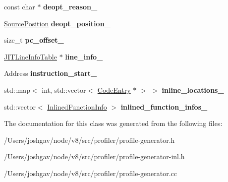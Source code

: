 \begin{DoxyCompactItemize}
\item 
const char $\ast$ {\bfseries deopt\+\_\+reason\+\_\+}\hypertarget{classv8_1_1internal_1_1_code_entry_a46d798d3a97e54b4719b54176f120787}{}\label{classv8_1_1internal_1_1_code_entry_a46d798d3a97e54b4719b54176f120787}

\item 
\hyperlink{classv8_1_1internal_1_1_source_position}{Source\+Position} {\bfseries deopt\+\_\+position\+\_\+}\hypertarget{classv8_1_1internal_1_1_code_entry_a0fc32457914ac0db29226d44685e803f}{}\label{classv8_1_1internal_1_1_code_entry_a0fc32457914ac0db29226d44685e803f}

\item 
size\+\_\+t {\bfseries pc\+\_\+offset\+\_\+}\hypertarget{classv8_1_1internal_1_1_code_entry_aaf64a854cd0a85e224b2e4ef7c868312}{}\label{classv8_1_1internal_1_1_code_entry_aaf64a854cd0a85e224b2e4ef7c868312}

\item 
\hyperlink{classv8_1_1internal_1_1_j_i_t_line_info_table}{J\+I\+T\+Line\+Info\+Table} $\ast$ {\bfseries line\+\_\+info\+\_\+}\hypertarget{classv8_1_1internal_1_1_code_entry_a7c67e78ea71087fdb88dd91a91252190}{}\label{classv8_1_1internal_1_1_code_entry_a7c67e78ea71087fdb88dd91a91252190}

\item 
Address {\bfseries instruction\+\_\+start\+\_\+}\hypertarget{classv8_1_1internal_1_1_code_entry_a9953c28773cfcbc8666aa2579d71ac2f}{}\label{classv8_1_1internal_1_1_code_entry_a9953c28773cfcbc8666aa2579d71ac2f}

\item 
std\+::map$<$ int, std\+::vector$<$ \hyperlink{classv8_1_1internal_1_1_code_entry}{Code\+Entry} $\ast$ $>$ $>$ {\bfseries inline\+\_\+locations\+\_\+}\hypertarget{classv8_1_1internal_1_1_code_entry_a08b4cbc293b43337a27387fdceb99f72}{}\label{classv8_1_1internal_1_1_code_entry_a08b4cbc293b43337a27387fdceb99f72}

\item 
std\+::vector$<$ \hyperlink{structv8_1_1internal_1_1_inlined_function_info}{Inlined\+Function\+Info} $>$ {\bfseries inlined\+\_\+function\+\_\+infos\+\_\+}\hypertarget{classv8_1_1internal_1_1_code_entry_ae28c572bf6b53e25fee64b272670891b}{}\label{classv8_1_1internal_1_1_code_entry_ae28c572bf6b53e25fee64b272670891b}

\end{DoxyCompactItemize}


The documentation for this class was generated from the following files\+:\begin{DoxyCompactItemize}
\item 
/\+Users/joshgav/node/v8/src/profiler/profile-\/generator.\+h\item 
/\+Users/joshgav/node/v8/src/profiler/profile-\/generator-\/inl.\+h\item 
/\+Users/joshgav/node/v8/src/profiler/profile-\/generator.\+cc\end{DoxyCompactItemize}
